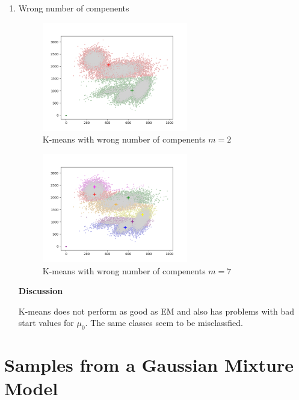\documentclass[12pt,a4paper]{article}
\begin{document}
\begin{enumerate}[start=2,label*={\arabic*.}]
\begin{enumerate}
  \end{enumerate}
  \item Wrong number of compenents

\begin{figure}[H]
  \centering
  \includegraphics[width=0.6\textwidth]{figures/2_0_m2.png}
	\caption{K-means with wrong number of compenents $m = 2$}
	\label{2_0_m2}
\end{figure}

\begin{figure}[H]
  \centering
  \includegraphics[width=0.6\textwidth]{figures/2_0_m7.png}
	\caption{K-means with wrong number of compenents $m = 7$}
	\label{2_0_m7}
\end{figure}

\textbf{Discussion}

K-means does not perform as good as EM and also has problems with bad start
values for $\mu_0$. The same classes seem to be misclassfied.

\end{enumerate}

\newpage
\section{ Samples from a Gaussian Mixture Model}
\end{document}
